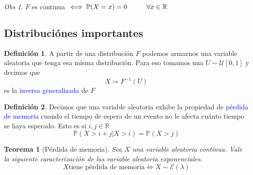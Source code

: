 \documentclass[11pt]{article}
\theoremstyle{plain} %
\newtheorem{teorema}{Teorema}
\theoremstyle{definition}
\newtheorem*{definicion}{Definici\'{o}n} %
\theoremstyle{remark}
\newtheorem{obs}{Obs}
\def\R{\mathbb{R}}
\def\P{\mathbb{P}}
\def\va{variable aleatoria }
\def\blue{\textcolor{blue}}
\begin{document}
\begin{obs}
	$F$ es continua $\iff \P(X=x) = 0 \hskip 1cm \forall x \in \R$ 
\end{obs}

\bigskip

\subsection{Distribuci\'ones importantes}

\begin{definicion}
	
	A partir de una distribuci\'on $F$ podemos armarnos una \va que tenga esa misma distribuci\'on. Para eso tomamos una $U \sim \mathcal{U}[0,1] $ y decimos que \[X \coloneqq F^{-1}(U)\]
	es la \blue{inversa generalizada} de $F$
\end{definicion}

\begin{definicion}
	\label{def:permem}
	Decimos que una \va exhibe la propiedad de \blue{p\'erdida de memoria} cuando el tiempo de espera de un evento no le afecta cu\'anto tiempo se haya esperado. Esto es si $i,j \in \R$
	\[\P(X>i+j | X > i) = \P(X>j)  \]
\end{definicion}

\begin{teorema}
	[P\'erdida de memoria]
	Sea $X$ una \va continua. Vale la siguiente caracterizaci\'on de las \va exponenciales.
	\[X \text{tiene p\'erdida de memoria} \iff X \sim \mathcal{E}(\lambda) \]
\end{teorema}
\end{document}
